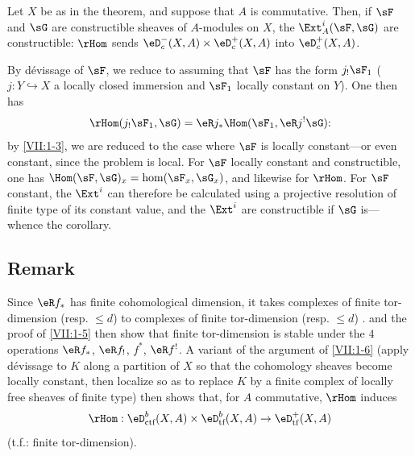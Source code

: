\documentclass[oneside]{book}
\begin{document}
\begin{corollary_}\label{VII:1-6}
Let $X$ be as in the theorem, and suppose that $A$ is commutative. Then, if
$\sF$ and $\sG$ are constructible sheaves of $A$-modules on $X$, the
$\Ext_A^i(\sF,\sG)$ are constructible: $\rHom$ sends
$\eD_c^-(X,A)\times \eD_c^+(X,A)$ into $\eD_c^+(X,A)$.
\end{corollary_}

By dévissage of $\sF$, we reduce to assuming that $\sF$ has the form
$j_!\sF_1$ ($j:Y\hookrightarrow X$ a locally closed immersion and $\sF_1$
locally constant on $Y$). One then has
\[
  \rHom(j_! \sF_1,\sG) = \eR j_\ast \Hom(\sF_1,\eR j^! \sG) \text{:}
\]
by \ref{VII:1-3}, we are reduced to the case where $\sF$ is locally
constant---or even constant, since the problem is local. For $\sF$ locally
constant and constructible, one has
$\Hom(\sF,\sG)_x=\hom(\sF_x,\sG_x)$, and likewise for $\rHom$. For $\sF$
constant, the $\Ext^i$ can therefore be calculated using a projective
resolution of finite type of its constant value, and the $\Ext^i$ are
constructible if $\sG$ is---whence the corollary.






\subsection{Remark}\label{VII:1-7}

Since $\eR f_\ast$ has finite cohomological dimension, it takes complexes of
finite tor-dimension (resp. $\leqslant d$) to complexes of finite
tor-dimension (resp. $\leqslant d$) \cite[XVII 5.2.11]{sga4}.
\cite[XVII 5.2.10]{sga4} and the proof of \ref{VII:1-5} then show that finite
tor-dimension is stable under the $4$ operations $\eR f_\ast$,
$\eR f_!$, $f^\ast$, $\eR f^!$. A variant of the argument of
\ref{VII:1-6} (apply dévissage to $K$ along a partition of $X$ so that the
cohomology sheaves become locally constant, then localize so as to replace $K$
by a finite complex of locally free sheaves of finite type) then shows that,
for $A$ commutative, $\rHom$ induces
\[
  \rHom:\eD_\text{ctf}^b(X,A)\times \eD_\text{tf}^b(X,A) \to \eD_\text{tf}^+(X,A)
\]
(t.f.: finite tor-dimension).






\subsection{}\label{VII:1-8}
\end{document}
